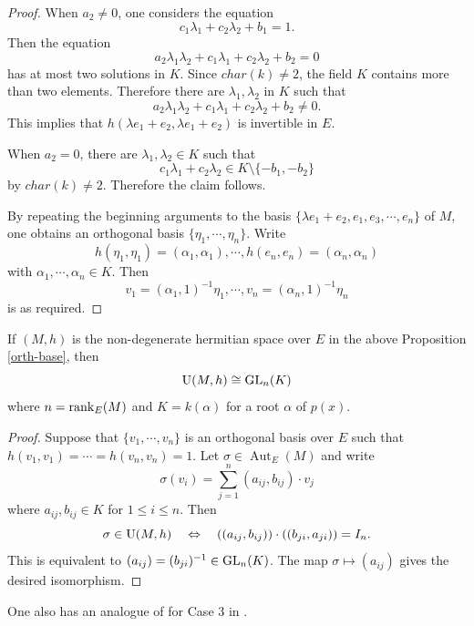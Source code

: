 \documentclass[12pt]{amsart}
\DeclareMathOperator{\Aut}{Aut}
\begin{document}
\begin{proof}
When $a_2\neq 0$, one considers the equation 
$$ c_1\lambda_1+c_2\lambda_2+b_1=1 .$$  Then the equation 
$$ a_2\lambda_1\lambda_2+ c_1\lambda_1+c_2\lambda_2+b_2=0 $$ has at most two solutions in $K$. Since $char(k)\neq 2$, the field $K$ contains more than two elements. Therefore there are $\lambda_1, \lambda_2$ in $K$ such that 
$$ a_2\lambda_1\lambda_2+ c_1\lambda_1+c_2\lambda_2+b_2 \neq 0 . $$ This implies that $h(\lambda e_1+ e_2, \lambda e_1+  e_2)$ is invertible in $E$. 


When $a_2=0$, there are $\lambda_1, \lambda_2\in K$ such that $$c_1\lambda_1+c_2\lambda_2 \in K\setminus \{-b_1, -b_2 \}$$ by $char(k)\neq 2$. Therefore the claim follows.

By repeating the beginning arguments to the basis $\{ \lambda e_1+ e_2, e_1, e_3, \cdots, e_n \}$ of $M$, one obtains an orthogonal basis $\{\eta_1, \cdots, \eta_n \}$. Write
$$ h(\eta_1, \eta_1)= (\alpha_1, \alpha_1), \cdots, h(e_n, e_n)=(\alpha_n, \alpha_n) $$ with $\alpha_1, \cdots, \alpha_n \in K$. Then 
$$ v_1= (\alpha_1, 1)^{-1} \eta_1, \cdots, v_n = (\alpha_n, 1)^{-1} \eta_n $$ is as required. 
\end{proof}

\begin{cor} If $(M, h)$ is the non-degenerate hermitian space over $E$ in the above Proposition \ref{orth-base}, then 
$${\rm U}(M, h) \cong {\rm GL}_n (K) $$ 
where $n={\rm rank}_E (M)$ and $K=k(\alpha)$ for a root  $\alpha$ of $p(x)$.
\end{cor}
\begin{proof}  Suppose that  $\{ v_1, \cdots, v_n \}$ is an orthogonal basis over $E$ such that $ h(v_1, v_1) = \cdots = h(v_n, v_n) =1$. Let $\sigma  \in \Aut_E(M)$ and write 
$$ \sigma(v_i) = \sum_{j=1}^n (a_{i j}, b_{i j})\cdot  v_j $$
where $a_{ij}, b_{ij}\in K$ for $1\leq i\leq n$.  Then 
$$ \sigma\in {\rm U}(M, h) \ \ \ \Leftrightarrow \ \ \ ((a_{ij}, b_{i j})) \cdot ((b_{j i}, a_{j i}) )= I_n .$$
This is equivalent to $(a_{ij})=(b_{ji})^{-1} \in {\rm GL}_n (K) $.  The map $\sigma \mapsto (a_{ij})$ gives the desired isomorphism.
\end{proof}


One also has an analogue of \cite[Theorem 3.2]{Mil} for Case 3 in \cite[\S 3]{Mil}. 
\end{document}

